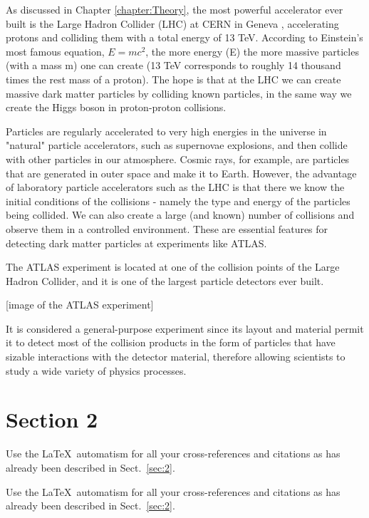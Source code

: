 \documentclass[graybox]{svmult}
\begin{document}
As discussed in Chapter \ref{chapter:Theory}, the most powerful accelerator ever built is the Large Hadron Collider (LHC) at CERN in Geneva \cite{LHC2008, LHC}, accelerating protons and colliding them with a total energy of 13 TeV. According to Einstein’s most famous equation, $E=mc^2$, the more energy (E) the more massive particles (with a mass m) one can create (13 TeV corresponds to roughly 14 thousand times the rest mass of a proton). The hope is that at the LHC we can create massive dark matter particles by colliding known particles, in the same way we create the Higgs boson in proton-proton collisions. 

Particles are regularly accelerated to very high energies in the universe in "natural" particle accelerators, such as supernovae explosions, and then collide with other particles in our atmosphere. Cosmic rays, for example, are particles that are generated in outer space and make it to Earth. However, the advantage of laboratory particle accelerators such as the LHC is that there we know the initial conditions of the collisions - namely the type and energy of the particles being collided. We can also create a large (and known) number of collisions and observe them in a controlled environment. These are essential features for detecting dark matter particles at experiments like ATLAS. 

The ATLAS experiment \cite{ATLAS2008,ATLAS} is located at one of the collision points of the Large Hadron Collider, and it is one of the largest particle detectors ever built. 

[image of the ATLAS experiment]

It is considered a general-purpose experiment since its layout and material permit it to detect most of the collision products in the form of particles that have sizable interactions with the detector material, therefore allowing scientists to study a wide variety of physics processes. 

\section{Section 2}
\label{sec:particle-collisions-atlas}




 Use the \LaTeX\ automatism for all your cross-references and citations as has already been described in Sect.~\ref{sec:2}.

 Use the \LaTeX\ automatism for all your cross-refer\-ences and citations as has already been described in Sect.~\ref{sec:2}.
\end{document}

